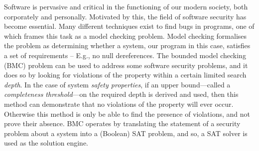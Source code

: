 \documentclass[
10pt, %
a4paper, %
oneside, %
headinclude,footinclude, %
BCOR5mm, %
]{scrartcl}
\begin{document}
Software is pervasive and critical in the functioning of our modern society, both corporately and personally. Motivated by this, the field of software security has become essential. Many different techniques exist to find bugs in programs, one of which frames this task as a model checking problem. Model checking formalises the problem as determining whether a system, our program in this case, satisfies a set of requirements -- E.g., no null dereferences. The bounded model checking (BMC) problem can be used to address some software security problems, and it does so by looking for violations of the property within a certain limited search {\em depth}. In the case of system {\em safety properties}, if an upper bound---called a {\em completeness threshold}---on the required depth is derived and used, then this method can demonstrate that no violations of the property will ever occur. Otherwise this method is only be able to find the presence of violations, and not prove their absence. BMC operates by translating the statement of a security problem about a system into a (Boolean) SAT problem, and so, a SAT solver is used as the solution engine.
\end{document}
